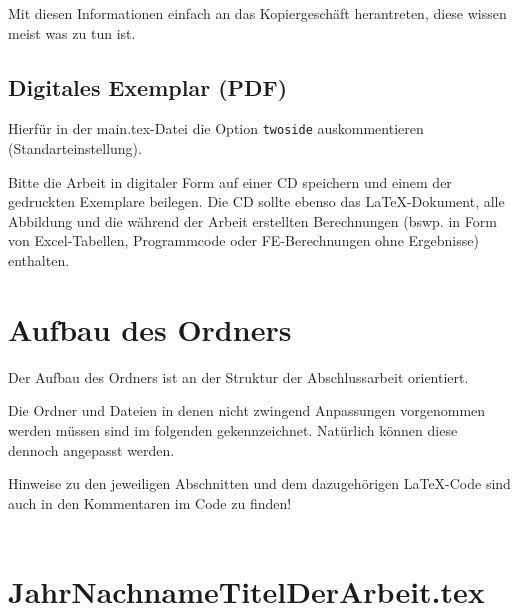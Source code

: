 Mit diesen Informationen einfach an das Kopiergeschäft herantreten, diese wissen meist was zu tun ist.

\subsection*{Digitales Exemplar (PDF)}

Hierfür in der main.tex-Datei die Option \lstinline[basicstyle=\ttfamily]|twoside| auskommentieren (Standarteinstellung).

Bitte die Arbeit in digitaler Form auf einer CD speichern und einem der gedruckten Exemplare beilegen. Die CD sollte ebenso das LaTeX-Dokument, alle Abbildung und die während der Arbeit erstellten Berechnungen (bswp. in Form von Excel-Tabellen, Programmcode oder FE-Berechnungen ohne Ergebnisse) enthalten.

\newpage

\section*{Aufbau des Ordners}

Der Aufbau des Ordners ist an der Struktur der Abschlussarbeit orientiert. 

Die Ordner und Dateien in denen nicht zwingend Anpassungen vorgenommen werden müssen sind im folgenden gekennzeichnet. Natürlich können diese dennoch angepasst werden.

Hinweise zu den jeweiligen Abschnitten und dem dazugehörigen LaTeX-Code sind auch in den Kommentaren im Code zu finden!\\ 
\\


\section*{JahrNachnameTitelDerArbeit.tex}

